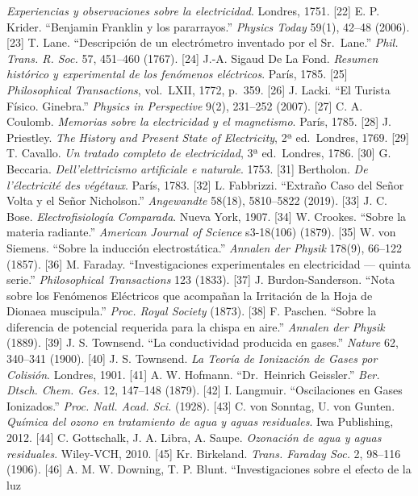 \documentclass[
  10pt,
  letterpaper,
  twocolumn]{article}
\begin{document}
\emph{Experiencias y observaciones sobre la electricidad}. Londres,
1751. {[}22{]} E. P. Krider. ``Benjamin Franklin y los pararrayos.''
\emph{Physics Today} 59(1), 42--48 (2006). {[}23{]} T. Lane.
``Descripción de un electrómetro inventado por el Sr.~Lane.''
\emph{Phil. Trans. R. Soc.} 57, 451--460 (1767). {[}24{]} J.-A. Sigaud
De La Fond. \emph{Resumen histórico y experimental de los fenómenos
eléctricos}. París, 1785. {[}25{]} \emph{Philosophical Transactions},
vol.~LXII, 1772, p.~359. {[}26{]} J. Lacki. ``El Turista Físico.
Ginebra.'' \emph{Physics in Perspective} 9(2), 231--252 (2007). {[}27{]}
C. A. Coulomb. \emph{Memorias sobre la electricidad y el magnetismo}.
París, 1785. {[}28{]} J. Priestley. \emph{The History and Present State
of Electricity}, 2ª ed.~Londres, 1769. {[}29{]} T. Cavallo. \emph{Un
tratado completo de electricidad}, 3ª ed.~Londres, 1786. {[}30{]} G.
Beccaria. \emph{Dell'elettricismo artificiale e naturale}. 1753.
{[}31{]} Bertholon. \emph{De l'électricité des végétaux}. París, 1783.
{[}32{]} L. Fabbrizzi. ``Extraño Caso del Señor Volta y el Señor
Nicholson.'' \emph{Angewandte} 58(18), 5810--5822 (2019). {[}33{]} J. C.
Bose. \emph{Electrofisiología Comparada}. Nueva York, 1907. {[}34{]} W.
Crookes. ``Sobre la materia radiante.'' \emph{American Journal of
Science} s3-18(106) (1879). {[}35{]} W. von Siemens. ``Sobre la
inducción electrostática.'' \emph{Annalen der Physik} 178(9), 66--122
(1857). {[}36{]} M. Faraday. ``Investigaciones experimentales en
electricidad --- quinta serie.'' \emph{Philosophical Transactions} 123
(1833). {[}37{]} J. Burdon-Sanderson. ``Nota sobre los Fenómenos
Eléctricos que acompañan la Irritación de la Hoja de Dionaea
muscipula.'' \emph{Proc. Royal Society} (1873). {[}38{]} F. Paschen.
``Sobre la diferencia de potencial requerida para la chispa en aire.''
\emph{Annalen der Physik} (1889). {[}39{]} J. S. Townsend. ``La
conductividad producida en gases.'' \emph{Nature} 62, 340--341 (1900).
{[}40{]} J. S. Townsend. \emph{La Teoría de Ionización de Gases por
Colisión}. Londres, 1901. {[}41{]} A. W. Hofmann. ``Dr.~Heinrich
Geissler.'' \emph{Ber. Dtsch. Chem. Ges.} 12, 147--148 (1879). {[}42{]}
I. Langmuir. ``Oscilaciones en Gases Ionizados.'' \emph{Proc. Natl.
Acad. Sci.} (1928). {[}43{]} C. von Sonntag, U. von Gunten.
\emph{Química del ozono en tratamiento de agua y aguas residuales}. Iwa
Publishing, 2012. {[}44{]} C. Gottschalk, J. A. Libra, A. Saupe.
\emph{Ozonación de agua y aguas residuales}. Wiley-VCH, 2010. {[}45{]}
Kr. Birkeland. \emph{Trans. Faraday Soc.} 2, 98--116 (1906). {[}46{]} A.
M. W. Downing, T. P. Blunt. ``Investigaciones sobre el efecto de la luz
\end{document}

